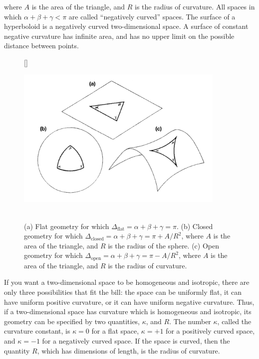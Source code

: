 \documentclass[a4paper,11pt]{article}
\begin{document}
{\noindent}where $A$ is the area of the triangle, and $R$ is the radius of curvature. All spaces in which $\alpha + \beta + \gamma < \pi$ are called ``negatively curved'' spaces. The surface of a hyperboloid is a negatively curved two-dimensional space. A surface of constant negative curvature has infinite area, and has no upper limit on the possible distance between points.

\begin{figure}[h]
    [\FBwidth]
    {\caption{\footnotesize{\\(a) Flat geometry for which $ \Delta_\mathrm{flat} = \alpha + \beta + \gamma = \pi$. (b) Closed geometry for which $\Delta_\mathrm{closed} = \alpha + \beta + \gamma = \pi + A/R^2$, where $A$ is the area of the triangle, and $R$ is the radius of the sphere. (c) Open geometry for which $\Delta_\mathrm{open} = \alpha + \beta + \gamma = \pi - A/R^2$, where $A$ is the area of the triangle, and $R$ is the radius of curvature.}}
    \label{fig:geometries}}
    {\includegraphics[width=10cm]{figures/geometries.png}}
\end{figure}

{\noindent}If you want a two-dimensional space to be homogeneous and isotropic, there are only three possibilities that fit the bill: the space can be uniformly flat, it can have uniform positive curvature, or it can have uniform negative curvature. Thus, if a two-dimensional space has curvature which is homogeneous and isotropic, its geometry can be specified by two quantities, $\kappa$, and $R$. The number $\kappa$, called the curvature constant, is $\kappa = 0$ for a flat space, $\kappa = +1$ for a positively curved space, and $\kappa = −1$ for a negatively curved space. If the space is curved, then the quantity $R$, which has dimensions of length, is the radius of curvature.
\end{document}
